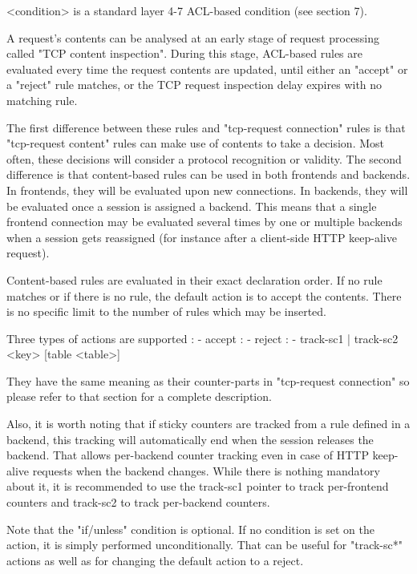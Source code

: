 \begin{description}
\begin{itemize}
    <condition> is a standard layer 4-7 ACL-based condition (see section 7).

  A request's contents can be analysed at an early stage of request processing
  called "TCP content inspection". During this stage, ACL-based rules are
  evaluated every time the request contents are updated, until either an
  "accept" or a "reject" rule matches, or the TCP request inspection delay
  expires with no matching rule.

  The first difference between these rules and "tcp-request connection" rules
  is that "tcp-request content" rules can make use of contents to take a
  decision. Most often, these decisions will consider a protocol recognition or
  validity. The second difference is that content-based rules can be used in
  both frontends and backends. In frontends, they will be evaluated upon new
  connections. In backends, they will be evaluated once a session is assigned
  a backend. This means that a single frontend connection may be evaluated
  several times by one or multiple backends when a session gets reassigned
  (for instance after a client-side HTTP keep-alive request).

  Content-based rules are evaluated in their exact declaration order. If no
  rule matches or if there is no rule, the default action is to accept the
  contents. There is no specific limit to the number of rules which may be
  inserted.

  Three types of actions are supported :
    - accept :
    - reject :
    - { track-sc1 | track-sc2 } <key> [table <table>]

  They have the same meaning as their counter-parts in "tcp-request connection"
  so please refer to that section for a complete description.

  Also, it is worth noting that if sticky counters are tracked from a rule
  defined in a backend, this tracking will automatically end when the session
  releases the backend. That allows per-backend counter tracking even in case
  of HTTP keep-alive requests when the backend changes. While there is nothing
  mandatory about it, it is recommended to use the track-sc1 pointer to track
  per-frontend counters and track-sc2 to track per-backend counters.

  Note that the "if/unless" condition is optional. If no condition is set on
  the action, it is simply performed unconditionally. That can be useful for
  "track-sc*" actions as well as for changing the default action to a reject.


\end{itemize}
\end{description}
